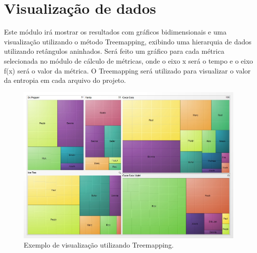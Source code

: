 \section{Visualização de dados}
Este módulo irá mostrar os resultados com gráficos bidimensionais e uma visualização utilizando o método Treemapping, exibindo uma hierarquia de dados utilizando retângulos aninhados. Será feito um gráfico para cada métrica selecionada no módulo de cálculo de métricas, onde o eixo x será o tempo e o eixo f(x) será o valor da métrica. O Treemapping será utilizado para visualizar o valor da entropia em cada arquivo do projeto.

\begin{figure}[h]
	\captionsetup{justification=raggedright}
	\includegraphics[scale=0.3]{treemap.jpg}
	\caption{Exemplo de visualização utilizando Treemapping.}
	\label{figura:visaometodo}
\end{figure}